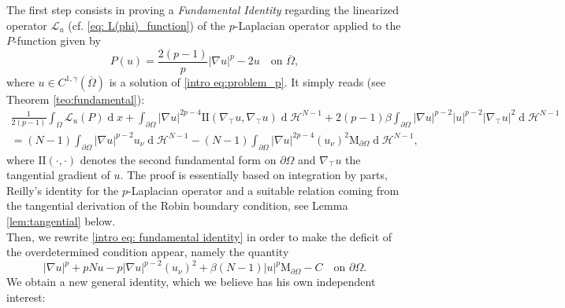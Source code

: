 \documentclass[10pt,a4paper]{amsart}
\numberwithin{equation}{section}
\renewcommand{\d}[1]{\ensuremath{\operatorname{d}\!{#1}}}
\begin{document}
The first step consists in proving a \textit{Fundamental Identity} regarding the linearized operator $\mathcal{L}_u$ (cf. \eqref{eq: L(phi)_function}) of the $p$-Laplacian operator applied to the $P$-function given by
\begin{equation}\label{intro eq:P_function p}
    P(u) = \frac{2(p-1)}{p}|\nabla u|^p - 2u \quad \text{on } \overline{\Omega},
\end{equation}
where $u \in C^{1,\gamma}(\overline{\Omega})$ is a solution of \eqref{intro eq:problem_p}. It simply reads (see Theorem \ref{teo:fundamental}):
\begin{equation}\label{intro eq: fundamental identity}
    \begin{aligned}
    \frac{1}{2(p-1)}\int_\Omega \mathcal{L}_u(P) \d{x} +\int_{\partial\Omega} |\nabla u|^{2p-4} \mathrm{I\!I}(\nabla_\top u,\nabla_\top u) \d{}\mathcal{H}^{N-1}+ 2(p-1) \beta\int_{\partial\Omega} |\nabla u|^{p-2}|u|^{p-2}|\nabla_\top u|^2 \d{}\mathcal{H}^{N-1} \\= (N-1) \int_{\partial\Omega} |\nabla u|^{p-2} u_\nu \d{}\mathcal{H}^{N-1}
    - (N-1) \int_{\partial\Omega} |\nabla u|^{2p-4} (u_\nu)^2 \mathrm{M}_{\partial\Omega} \d{}\mathcal{H}^{N-1},
    \end{aligned}
\end{equation}
where $\mathrm{I\!I}(\cdot,\cdot)$ denotes the second fundamental form on $\partial\Omega$ and $\nabla_\top u$ the tangential gradient of $u$. The proof is essentially based on integration by parts, Reilly's identity for the $p$-Laplacian operator and a suitable relation coming from the tangential derivation of the Robin boundary condition, see Lemma \ref{lem:tangential} below.
\\
Then, we rewrite \eqref{intro eq: fundamental identity} in order to make the deficit of the overdetermined condition appear, namely the quantity
\begin{equation*}
    |\nabla u|^p + pNu - p |\nabla u|^{p-2} (u_\nu)^2 + \beta(N-1) |u|^p \mathrm{M}_{\partial\Omega} - C  \quad\text{on } \partial\Omega.
\end{equation*}
We obtain a new general identity, which we believe has his own independent interest:
\end{document}
